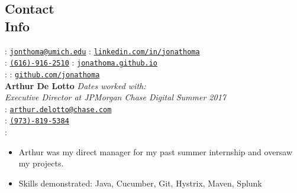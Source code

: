 \documentclass[margin,line,11pt]{resume}
\begin{document}
      
\begin{resume}
	\section{\mysidestyle Contact\\Info}
	\faEnvelope : \href{mailto:jonthoma@umich.edu}{\nolinkurl{jonthoma@umich.edu}} \hfill \faLinkedinSign : \href{https://linkedin.com/in/jonathoma}{\nolinkurl{linkedin.com/in/jonathoma}}\\
	\faPhone : \href{tel:+1-616-916-2510}{\nolinkurl{(616)-916-2510}} \hfill \faUser : \href{https://jonathoma.github.io}{\nolinkurl{jonathoma.github.io}} \\ 
	\faHome : \rmfamily \hfill \faGithub : \href{https://github.com/jonathoma}{\nolinkurl{github.com/jonathoma}} \\
	
	\sectionbreak
	\textbf{Arthur De Lotto} \hfill \textsl{Dates worked with:}\\
	\textsl{Executive Director at JPMorgan Chase Digital} \hfill \textsl{Summer 2017} \\
	\faEnvelope : \href{mailto:arthur.delotto@chase.com}{\nolinkurl{arthur.delotto@chase.com}} \\
	\faPhone : \href{tel:+1-973-819-5384}{\nolinkurl{(973)-819-5384}} \\
	 \faHome : \rmfamily \\ 
	 \vspace{-4mm}
	 \begin{itemize}
	 	\item Arthur was my direct manager for my past summer internship and oversaw my projects.
		\item Skills demonstrated: Java, Cucumber, Git, Hystrix, Maven, Splunk 
	\end{itemize}
	
	

\end{resume}
\end{document}
